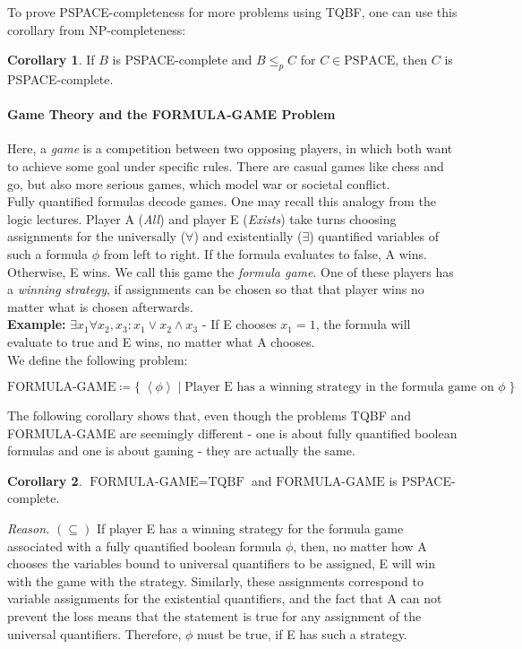 \documentclass[10pt,fleqn]{article}
\theoremstyle{definition}
\newtheorem{corollary}{Corollary}
\theoremstyle{remark}
\newcommand{\pspaceclass}{\text{PSPACE}}
\newcommand{\tqbfprob}{\text{TQBF}}
\newcommand{\formulagameprob}{\text{FORMULA-GAME}}
\newcommand{\lpp}{\left \langle}
\newcommand{\rpp}{\right \rangle}
\newcommand{\enc}[1]{\lpp #1 \rpp}
\begin{document}
To prove PSPACE-completeness for more problems using TQBF, one can use this corollary from NP-completeness:
\begin{corollary}
    If \(B\) is PSPACE-complete and \(B \leq_p C\) for \(C \in \pspaceclass\), then \(C\) is PSPACE-complete.
\end{corollary}

\newpage

\paragraph*{Game Theory and the FORMULA-GAME Problem} Here, a \emph{game} is a competition between two opposing players, in which both want to achieve some goal under specific rules. There are casual games like chess and go, but also more serious games, which model war or societal conflict.\\

Fully quantified formulas decode games. One may recall this analogy from the logic lectures. Player A (\emph{All}) and player E (\emph{Exists}) take turns choosing assignments for the universally (\(\forall\)) and existentially (\(\exists\)) quantified variables of such a formula \(\phi\) from left to right. If the formula evaluates to false, A wins. Otherwise, E wins. We call this game the \emph{formula game}. One of these players has a \emph{winning strategy}, if assignments can be chosen so that that player wins no matter what is chosen afterwards.\\

\textbf{Example:} \(\exists x_1 \forall x_2, x_3\colon x_1 \lor x_2 \land x_3\) - If E chooses \(x_1 = 1\), the formula will evaluate to true and E wins, no matter what A chooses.\\

We define the following problem:
\begin{ceqn}
    \[
        \formulagameprob \coloneqq \{ \; \enc{\phi} \mid \text{Player E has a winning strategy in the formula game on } \phi \; \}
    \]
\end{ceqn}

The following corollary shows that, even though the problems TQBF and FORMULA-GAME are seemingly different - one is about fully quantified boolean formulas and one is about gaming - they are actually the same.

\begin{corollary} \(\formulagameprob = \tqbfprob\) and \(\formulagameprob\) is PSPACE-complete.
\end{corollary}
\emph{Reason.} \((\subseteq)\) If player E has a winning strategy for the formula game associated with a fully quantified boolean formula \(\phi\), then, no matter how A chooses the variables bound to universal quantifiers to be assigned, E will win with the game with the strategy. Similarly, these assignments correspond to variable assignments for the existential quantifiers, and the fact that A can not prevent the loss means that the statement is true for any assignment of the universal quantifiers. Therefore, \(\phi\) must be true, if E has such a strategy.
\end{document}

